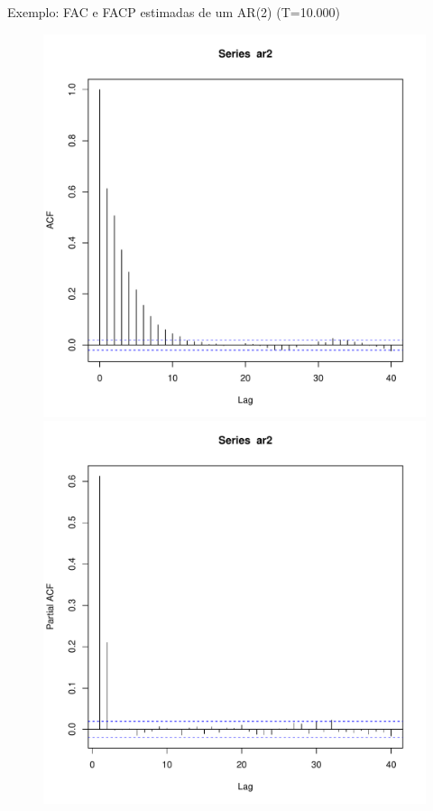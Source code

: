 \documentclass[11pt]{beamer}
\begin{document}
\begin{frame}{Exemplo: FAC e FACP estimadas de um AR(2) (T=10.000)}
	\begin{figure}
		\includegraphics[scale=0.33]{graficos/ar2_fac.pdf} 		\includegraphics[scale=0.33]{graficos/ar2_facp.pdf}
	\end{figure}
\end{frame}
\end{document}
